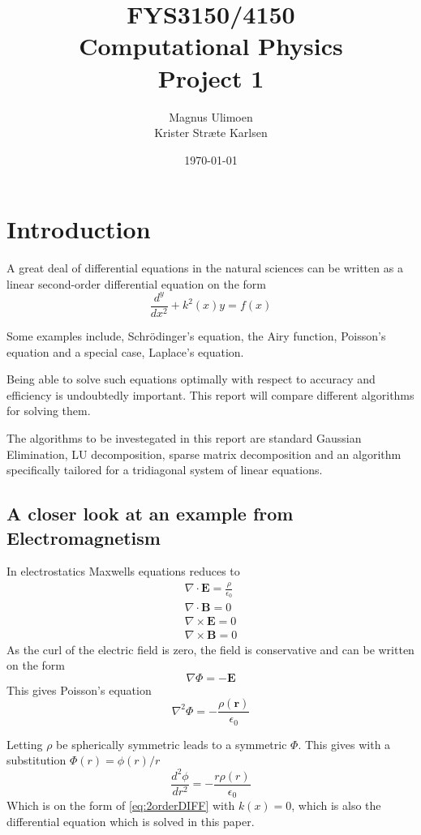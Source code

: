 \documentclass[11pt,a4paper,english,draft]{article}
\title{FYS3150/4150\\Computational Physics\\Project 1}
\author{Magnus Ulimoen\\Krister Stræte Karlsen}
\date{\today}
\numberwithin{equation}{section}
\newcommand{\ve}[1]{\mathbf{#1}} %
\begin{document}
\maketitle

\section{Introduction}

A great deal of differential equations in the natural sciences can be written 
as a linear second-order differential equation on the form
\begin{equation}
\frac{d^y}{dx^2} + k^2(x)y = f(x)
\label{eq:2orderDIFF}
\end{equation}

Some examples include, Schrödinger's equation, the Airy function,
Poisson's equation and a special case, Laplace's equation.

Being able to solve such equations optimally with respect to accuracy 
and efficiency is undoubtedly important. This report will compare 
different algorithms for solving them.

The algorithms to be investegated in this report are	 standard Gaussian 
Elimination, LU decomposition, sparse matrix decomposition and an 
algorithm specifically tailored for a tridiagonal system of 
linear equations. 


\subsection{A closer look at an example from Electromagnetism}

In electrostatics Maxwells equations reduces to
\begin{gather}
\nabla \cdot \ve{E} = \frac{\rho}{\epsilon_0}\\
\nabla \cdot \ve{B} = 0\\
\nabla \times \ve{E} = 0\\
\nabla \times \ve{B} = 0
\end{gather}
As the curl of the electric field is zero, the field is conservative
and can be written on the form
\begin{equation}
\nabla \Phi = -\ve{E}
\end{equation}
This gives Poisson's equation
\begin{equation}
\nabla^2\Phi = -\frac{\rho(\ve{r})}{\epsilon_0}
\end{equation}

Letting $\rho$ be spherically symmetric leads to a symmetric $\Phi$.
This gives with a substitution $\Phi(r) = \phi(r)/r$
\begin{equation}
\frac{d^2\phi}{dr^2} = -\frac{r\rho(r)}{\epsilon_0}
\end{equation}
Which is on the form of \eqref{eq:2orderDIFF} with $k(x)=0$, which is also the differential
equation which is solved in this paper.
\end{document}
